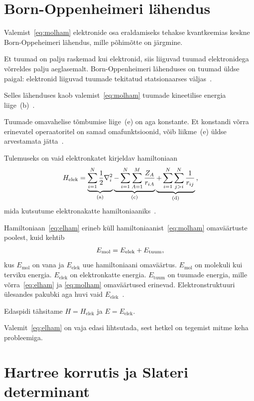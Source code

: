 \documentclass[12pt]{report}
\begin{document}
\section{Born-Oppenheimeri lähendus}\label{sec:bo}

Valemist~\eqref{eq:molham} elektronide osa eraldamiseks tehakse kvantkeemias keskne Born-Oppeheimeri lähendus, mille põhimõtte on järgmine.

Et tuumad on palju raskemad kui elektronid, siis liiguvad tuumad elektronidega võrreldes palju aeglasemalt.
Born-Oppenheimeri lähenduses on tuumad üldse paigal: elektronid liiguvad tuumade tekitatud statsionaarses väljas~\cite{szabo+ostlund}.

Selles lähenduses kaob valemist~\eqref{eq:molham} tuumade kineetilise energia liige~(b)~\cite{szabo+ostlund}.

Tuumade omavahelise tõmbumise liige~(e) on aga konstante.
Et konstandi võrra erinevatel operaatoritel on samad omafunktsioonid, võib liikme~(e) üldse arvestamata jätta~\cite{szabo+ostlund}.

Tulemuseks on vaid elektronkatet kirjeldav hamiltoniaan
\begin{align}\label{eq:elham}
    H_\text{elek} = \underbrace{\sum_{i = 1}^N \frac{1}{2} \nabla_i^2}_\text{(a)}
    \underbrace{- \sum_{i = 1}^N \sum_{A = 1}^M \frac{Z_A}{r_{iA}}}_\text{(c)}
    \underbrace{+ \sum_{i = 1}^N \sum_{j > i}^N \frac{1}{r_{ij}}}_\text{(d)} \rlap{,}
\end{align}
mida kutsutume elektronakatte hamiltoniaaniks~\cite{szabo+ostlund}.

Hamiltoniaan~\eqref{eq:elham} erineb küll hamiltoniaanist~\eqref{eq:molham} omaväärtuste poolest, kuid kehtib
\begin{align}
    E_\text{mol} = E_\text{elek} + E_\text{tuum} \rlap{,}
\end{align}
kus \(E_\text{mol}\) on vana ja \(E_\text{elek}\) uue hamiltoniaani omaväärtus.
\(E_\text{mol}\) on molekuli kui terviku energia.
\(E_\text{elek}\) on elektronkatte energia.
\(E_\text{tuum}\) on tuumade energia, mille võrra~\eqref{eq:elham} ja \eqref{eq:molham} omaväärtused erinevad.
Elektronstruktuuri ülesandes pakubki aga huvi vaid \(E_\text{elek}\)~\cite{szabo+ostlund}.

Edaspidi tähsitame \(H = H_\text{elek}\) ja \(E = E_\text{elek}\).

Valemit~\eqref{eq:elham} on vaja edasi lihtsutada, sest hetkel on tegemist mitme keha probleemiga.

\section{Hartree korrutis ja Slateri determinant}\label{sec:hpsd}
\end{document}
